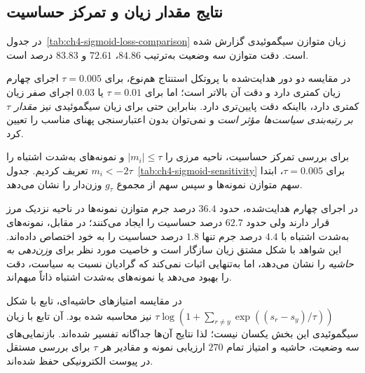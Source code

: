\subsection{نتایج مقدار زیان و تمرکز حساسیت}
\label{subsec:ch4-sigmoid-results}
در جدول~\ref{tab:ch4-sigmoid-loss-comparison} زیان متوازن سیگموئیدی گزارش شده است. دقت متوازن سه وضعیت به‌ترتیب $84.86$، $72.61$ و $83.83$ درصد است.

در مقایسه دو دور هدایت‌شده با پروتکل استنتاج هم‌نوع، برای $\tau=0.005$ اجرای چهارم زیان کمتری دارد و دقت آن بالاتر است؛ اما برای $\tau=0.01$ یا $0.03$ اجرای صفر زیان کمتری دارد، بااینکه دقت پایین‌تری دارد. بنابراین حتی برای زیان سیگموئیدی نیز \emph{مقدار $\tau$ بر رتبه‌بندی سیاست‌ها مؤثر است} و نمی‌توان بدون اعتبارسنجی پهنای مناسب را تعیین کرد.

برای بررسی تمرکز حساسیت، ناحیه مرزی را $|m_i|\le\tau$ و نمونه‌های به‌شدت اشتباه را $m_i<-2\tau$ تعریف کردیم. جدول~\ref{tab:ch4-sigmoid-sensitivity} برای $\tau=0.005$، ابتدا سهم متوازن نمونه‌ها و سپس سهم از مجموع $g_\tau$ وزن‌دار را نشان می‌دهد.

در اجرای چهارم هدایت‌شده، حدود $36.4$ درصد جرم متوازن نمونه‌ها در ناحیه نزدیک مرز قرار دارند ولی حدود $62.7$ درصد حساسیت را ایجاد می‌کنند؛ در مقابل، نمونه‌های به‌شدت اشتباه با $4.4$ درصد جرم تنها $1.8$ درصد حساسیت را به خود اختصاص داده‌اند. این شواهد با شکل مشتق زیان سازگار است و خاصیت مورد نظر برای \emph{وزن‌دهی به حاشیه} را نشان می‌دهد، اما به‌تنهایی اثبات نمی‌کند که گرادیان نسبت به سیاست، دقت را بهبود می‌دهد یا نمونه‌های به‌شدت اشتباه ذاتاً مبهم‌اند.

در مقایسه امتیازهای حاشیه‌ای، تابع  با شکل $\tau\log(1+\sum_{r\ne y}\exp((s_r-s_y)/\tau))$ نیز محاسبه شده بود. آن تابع با زیان سیگموئیدی این بخش یکسان نیست؛ لذا نتایج آن‌ها جداگانه تفسیر شده‌اند. بازنمایی‌های سه وضعیت، حاشیه و امتیاز تمام $270$ ارزیابی نمونه و مقادیر هر $\tau$ برای بررسی مستقل در پیوست الکترونیکی حفظ شده‌اند.



